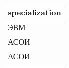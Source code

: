 \begin{tabular}{l}
\toprule
specialization \\
\midrule
ЭВМ \\
АСОИ \\
АСОИ \\
\bottomrule
\end{tabular}

